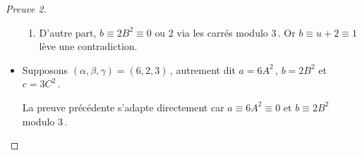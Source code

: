\begin{proof}[Preuve 2]
\begin{itemize}
\begin{enumerate}
			\item D'autre part, $b \equiv 2 B^2 \equiv \text{$0$ ou $2$}$ via les carrés modulo $3$\,.
			Or $b \equiv u + 2 \equiv 1$ lève une contradiction.
		\end{enumerate}
		
		
		\item Supposons $(\alpha, \beta, \gamma) = (6, 2, 3)$\,, 
		autrement dit 
		$a = 6 A^2$\,, $b = 2 B^2$ et $c = 3 C^2$\,.
		
		\smallskip
		\noindent
		La preuve précédente s'adapte directement car $a \equiv 6 A^2 \equiv 0$ et $b \equiv 2 B^2$ modulo $3$\,.
	\end{itemize}
\end{proof}

